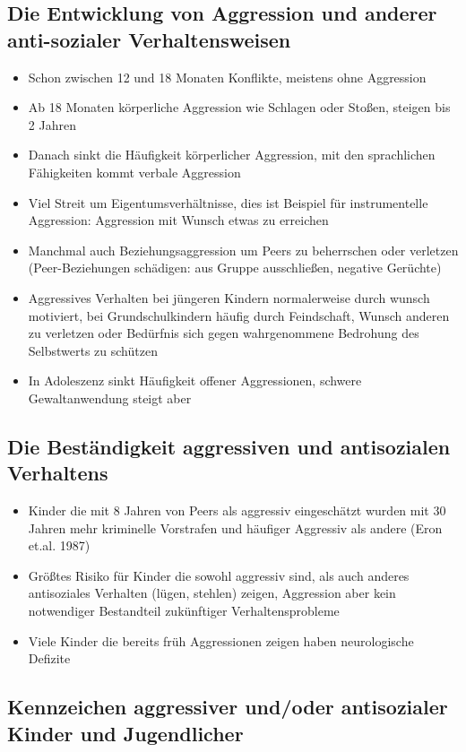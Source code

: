 \subsection{Die Entwicklung von Aggression und anderer anti-sozialer Verhaltensweisen}
\begin{itemize}
	\item
		Schon zwischen 12 und 18 Monaten Konflikte, meistens ohne Aggression
	\item
		Ab 18 Monaten körperliche Aggression wie Schlagen oder Stoßen, steigen bis 2 Jahren
	\item
		Danach sinkt die Häufigkeit körperlicher Aggression, mit den sprachlichen Fähigkeiten kommt verbale Aggression
	\item
		Viel Streit um Eigentumsverhältnisse, dies ist Beispiel für instrumentelle Aggression: Aggression mit Wunsch etwas zu erreichen
	\item
		Manchmal auch Beziehungsaggression um Peers zu beherrschen oder verletzen (Peer-Beziehungen schädigen: aus Gruppe ausschließen, negative Gerüchte)
	\item
		Aggressives Verhalten bei jüngeren Kindern normalerweise durch wunsch motiviert, bei Grundschulkindern häufig durch Feindschaft, Wunsch anderen zu verletzen oder Bedürfnis sich gegen wahrgenommene Bedrohung des Selbstwerts zu schützen
	\item
		In Adoleszenz sinkt Häufigkeit offener Aggressionen, schwere Gewaltanwendung steigt aber
\end{itemize}
\subsection{Die Beständigkeit aggressiven und antisozialen Verhaltens}
\begin{itemize}
	\item
		Kinder die mit 8 Jahren von Peers als aggressiv eingeschätzt wurden mit 30 Jahren mehr kriminelle Vorstrafen und häufiger Aggressiv als andere (Eron et.al. 1987)
	\item
		Größtes Risiko für Kinder die sowohl aggressiv sind, als auch anderes antisoziales Verhalten (lügen, stehlen) zeigen, Aggression aber kein notwendiger Bestandteil zukünftiger Verhaltensprobleme
	\item
		Viele Kinder die bereits früh Aggressionen zeigen haben neurologische Defizite
\end{itemize}


\subsection{Kennzeichen aggressiver und/oder antisozialer Kinder und Jugendlicher}
